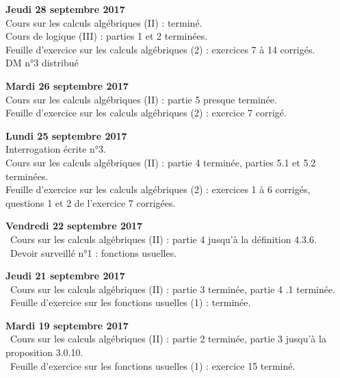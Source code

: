 \documentclass[12pt,a4paper]{article}
\begin{document}
\noindent\textbf{Jeudi 28 septembre 2017}\\
\bu{} Cours sur les calculs algébriques (II) : terminé. \\
\bu{} Cours de logique (III) : parties 1 et 2 terminées. \\
\bu{} Feuille d'exercice sur les calculs algébriques (2) : exercices 7 à 14 corrigés.  \\
\bu{} DM n°3 distribué\\
\vspace{.4cm}

\noindent\textbf{Mardi 26 septembre 2017}\\
\bu{} Cours sur les calculs algébriques (II) : partie 5 presque terminée. \\
\bu{} Feuille d'exercice sur les calculs algébriques (2) : exercice 7 corrigé.  \\
\vspace{.4cm}

\noindent\textbf{Lundi 25 septembre 2017}\\
\bu{} Interrogation écrite n°3.\\
\bu{} Cours sur les calculs algébriques (II) : partie 4 terminée, parties 5.1 et 5.2 terminées. \\
\bu{} Feuille d'exercice sur les calculs algébriques (2) : exercices 1 à 6 corrigés, questions 1 et 2 de l'exercice 7 corrigées.  \\
\vspace{.4cm}

\noindent\textbf{Vendredi 22 septembre 2017}\\
\bu\ Cours sur les calculs algébriques (II) : partie 4 jusqu'à la définition 4.3.6. \\
\bu\ Devoir surveillé n°1 : fonctions usuelles. \\
\vspace{.4cm}

\noindent\textbf{Jeudi 21 septembre 2017}\\
\bu\ Cours sur les calculs algébriques (II) : partie 3 terminée, partie 4 .1 terminée. \\
\bu\ Feuille d'exercice sur les fonctions usuelles (1) : terminée. \\
\vspace{.4cm}

\noindent\textbf{Mardi 19 septembre 2017}\\
\bu\ Cours sur les calculs algébriques (II) : partie 2 terminée, partie 3 jusqu'à la proposition 3.0.10. \\
\bu\ Feuille d'exercice sur les fonctions usuelles (1) : exercice 15 terminé. \\
\vspace{.4cm}
\end{document}
